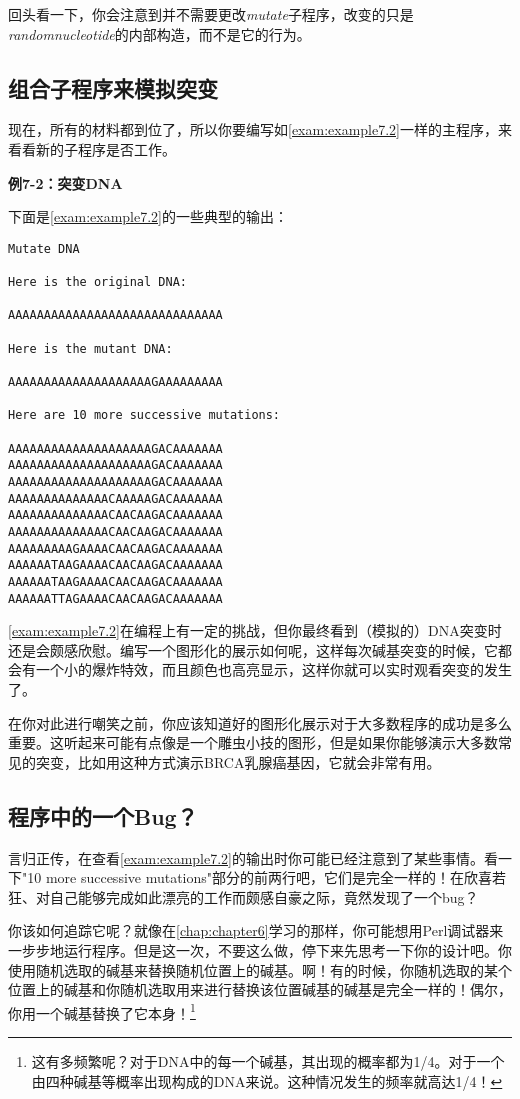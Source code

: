 回头看一下，你会注意到并不需要更改\textit{mutate}子程序，改变的只是\textit{randomnucleotide}的内部构造，而不是它的行为。

\subsection{组合子程序来模拟突变}
现在，所有的材料都到位了，所以你要编写如\autoref{exam:example7.2}一样的主程序，来看看新的子程序是否工作。

\textbf{例7-2：突变DNA}


下面是\autoref{exam:example7.2}的一些典型的输出：

\begin{lstlisting}
Mutate DNA

Here is the original DNA:

AAAAAAAAAAAAAAAAAAAAAAAAAAAAAA

Here is the mutant DNA:

AAAAAAAAAAAAAAAAAAAAGAAAAAAAAA

Here are 10 more successive mutations:

AAAAAAAAAAAAAAAAAAAAGACAAAAAAA
AAAAAAAAAAAAAAAAAAAAGACAAAAAAA
AAAAAAAAAAAAAAAAAAAAGACAAAAAAA
AAAAAAAAAAAAAACAAAAAGACAAAAAAA
AAAAAAAAAAAAAACAACAAGACAAAAAAA
AAAAAAAAAAAAAACAACAAGACAAAAAAA
AAAAAAAAAGAAAACAACAAGACAAAAAAA
AAAAAATAAGAAAACAACAAGACAAAAAAA
AAAAAATAAGAAAACAACAAGACAAAAAAA
AAAAAATTAGAAAACAACAAGACAAAAAAA
\end{lstlisting}

\autoref{exam:example7.2}在编程上有一定的挑战，但你最终看到（模拟的）DNA突变时还是会颇感欣慰。编写一个图形化的展示如何呢，这样每次碱基突变的时候，它都会有一个小的爆炸特效，而且颜色也高亮显示，这样你就可以实时观看突变的发生了。

在你对此进行嘲笑之前，你应该知道好的图形化展示对于大多数程序的成功是多么重要。这听起来可能有点像是一个雕虫小技的图形，但是如果你能够演示大多数常见的突变，比如用这种方式演示BRCA乳腺癌基因，它就会非常有用。

\subsection{程序中的一个Bug？}
言归正传，在查看\autoref{exam:example7.2}的输出时你可能已经注意到了某些事情。看一下"10 more successive mutations"部分的前两行吧，它们是完全一样的！在欣喜若狂、对自己能够完成如此漂亮的工作而颇感自豪之际，竟然发现了一个bug？

你该如何追踪它呢？就像在\autoref{chap:chapter6}学习的那样，你可能想用Perl调试器来一步步地运行程序。但是这一次，不要这么做，停下来先思考一下你的设计吧。你使用随机选取的碱基来替换随机位置上的碱基。啊！有的时候，你随机选取的某个位置上的碱基和你随机选取用来进行替换该位置碱基的碱基是完全一样的！偶尔，你用一个碱基替换了它本身！\footnote{这有多频繁呢？对于DNA中的每一个碱基，其出现的概率都为1/4。对于一个由四种碱基等概率出现构成的DNA来说。这种情况发生的频率就高达1/4！} 

